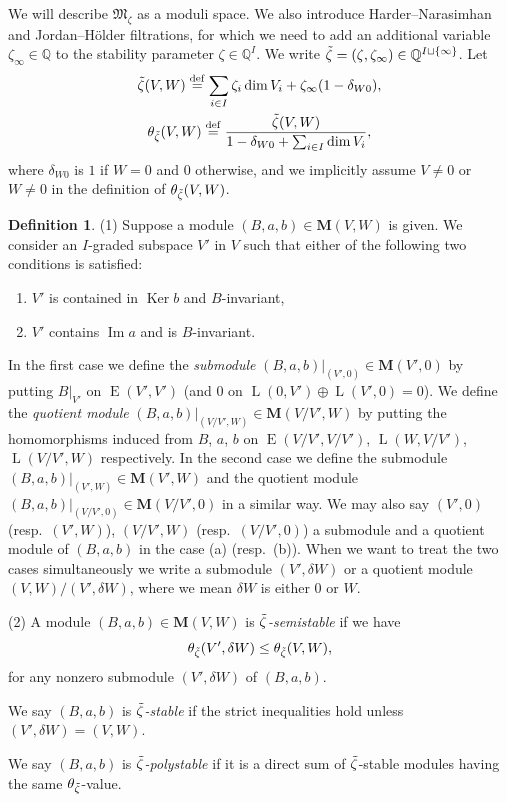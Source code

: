 \documentclass[10pt,a4paper]{amsart}
\newenvironment{aenume}{%
  \begin{enumerate}%
  \renewcommand{\theenumi}{\alph{enumi}}%
  \renewcommand{\labelenumi}{\textup{(\theenumi)}}%
  }{\end{enumerate}}
\theoremstyle{definition}
\newtheorem{Definition}[equation]{Definition}
\numberwithin{equation}{section}
\newcommand{\defeq}{\overset{\operatorname{\scriptstyle def}}{=}}
\newcommand{\Q}{{\mathbb Q}}
\newcommand{\Ker}{\operatorname{Ker}}
\newcommand{\Ima}{\operatorname{Im}}
\newcommand{\bM}{{\mathbf M}} %
\newcommand{\M}{{\mathfrak M}} %
\newcommand{\HomE}{\operatorname{E}}
\newcommand{\HomL}{\operatorname{L}}
\begin{document}
We will describe $\M_\zeta$ as a moduli space. We also introduce
Harder--Narasimhan and Jordan--H\"older f\/iltrations, for which we need
to add an additional variable $\zeta_\infty\in\Q$ to the stability
parameter $\zeta\in \Q^I$. We write $\Tilde\zeta =
(\zeta,\zeta_\infty) \in \Q^{I\sqcup\{\infty\}}$. Let
\begin{gather*}
 \Tilde\zeta(V,W)
   \defeq \sum_{i\in I} \zeta_{i} \dim V_i
   + \zeta_\infty (1-\delta_{W0}),
\\
 \theta_{\Tilde\zeta}(V,W)
   \defeq
   \frac{\Tilde\zeta(V,W)}{1 - \delta_{W0} + \sum_{i\in I} \dim V_i},
\end{gather*}
where $\delta_{W0}$ is $1$ if $W=0$ and $0$ otherwise, and we
implicitly assume $V\neq 0$ or $W\neq 0$ in the def\/inition of
$\theta_{\Tilde\zeta}(V,W)$.

\begin{Definition}\label{def:stable}
  \textup{(1)} Suppose a module $(B, a, b)\in\bM(V,W)$ is given. We
  consider an $I$-graded subspace $V'$ in $V$ such that either of the
  following two conditions is satisf\/ied:
\begin{aenume}\itemsep=0pt
\item $V'$ is contained in $\Ker b$ and $B$-invariant,
\item $V'$ contains $\Ima a$ and is $B$-invariant.
\end{aenume}
In the f\/irst case we def\/ine the {\it submodule\/} $(B,a,b)|_{(V',0)} \in
\bM(V',0)$ by putting $B|_{V'}$ on $\HomE(V',V')$ (and $0$ on
$\HomL(0,V')\oplus \HomL(V',0) = 0$). We def\/ine the {\it quotient
  module\/} $(B,a,b)|_{(V/V',W)}\!\in\! \bM(V/V',W)\!$ by putting
the homomorphisms induced from $B$, $a$, $b$ on
$\HomE(V/V',V/V')$, $\HomL(W,V/V')$, $\HomL(V/V',W)$ respectively.
%
In the second case we def\/ine the submodule
$(B,a,b)|_{(V',W)}\in \bM(V',W)$ and the quotient module
$(B,a,b)|_{(V/V',0)}\in \bM(V/V',0)$ in a similar way.
%
We may also say $(V',0)$ \textup(resp.\ $(V',W)$\textup), $(V/V',W)$
\textup(resp.\ $(V/V',0)$\textup) a submodule and a quotient module
of $(B,a,b)$ in the case (a) \textup(resp.\ (b)\textup).
%
When we want to treat the two cases simultaneously we write
a submodule $(V',\delta W)$ or a quotient module $(V, W)/(V',\delta W)$,
where we mean $\delta W$ is either $0$ or $W$.

\textup{(2)} A module $(B, a, b)\in\bM(V,W)$ is {\it
$\Tilde\zeta$-semistable\/} if we have
\begin{equation}\label{eq:slope}
   \theta_{\Tilde\zeta}(V',\delta W) \le \theta_{\Tilde\zeta}(V,W),
\end{equation}
for any nonzero submodule $(V',\delta W)$ of $(B,a,b)$.

We say $(B,a,b)$ is {\it $\Tilde\zeta$-stable\/} if the strict
inequalities hold unless $(V',\delta W) = (V,W)$.


We say $(B,a,b)$ is {\it $\Tilde\zeta$-polystable\/} if it is a
direct sum of $\Tilde\zeta$-stable modules having the same
$\theta_{\Tilde\zeta}$-value.
\end{Definition}
\end{document}

